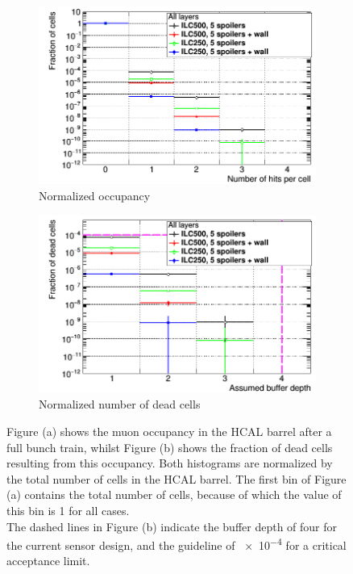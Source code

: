  \begin{figure}
 \centering
  \begin{subfigure}[b]{0.49\textwidth}
   \centering
    \includegraphics[width=\textwidth]{Figures/BDS_muons/Occupancy_Comparison_All_layers_wrt_cells_HcalBarrel.png}
   \caption{Normalized occupancy}
   \end{subfigure}
   \hfill
    \begin{subfigure}[b]{0.49\textwidth}
   \centering
    \includegraphics[width=\textwidth]{Figures/BDS_muons/Occupancy_Comparison_All_layers_deadcells_HcalBarrel.png}
   \caption{Normalized number of dead cells}
   \end{subfigure}
   \caption[\sid HCAL barrel occupancy from BDS muons]{Figure (a) shows the muon occupancy in the \sid HCAL barrel after a full bunch train, whilst Figure (b) shows the fraction of dead cells resulting from this occupancy.
   Both histograms are normalized by the total number of cells in the HCAL barrel.
   The first bin of Figure (a) contains the total number of cells, because of which the value of this bin is 1 for all cases.
   \\The dashed lines in Figure (b) indicate the buffer depth of four for the current sensor design, and the guideline of \num{e-4} for a critical acceptance limit.}
   \label{fig:BDS_Muons:HcalBarrel}
 \end{figure}
